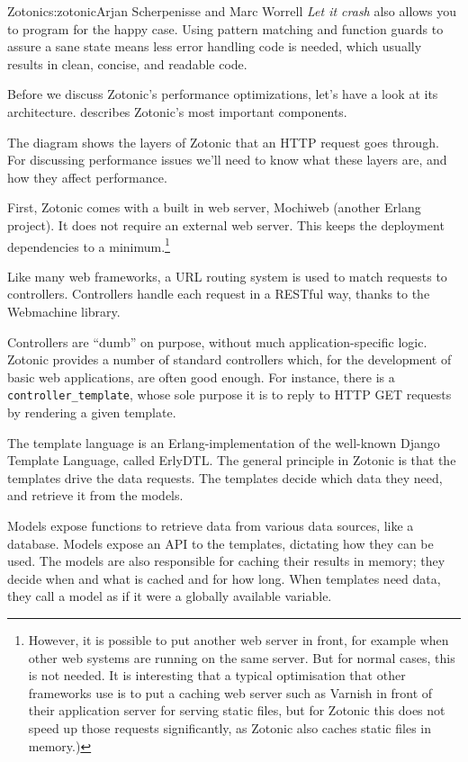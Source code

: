 \begin{aosachapter}{Zotonic}{s:zotonic}{Arjan Scherpenisse and Marc Worrell}
\emph{Let it crash} also allows you to program for the happy case. Using
pattern matching and function guards to assure a sane state means less
error handling code is needed, which usually results in clean, concise,
and readable code.


Before we discuss Zotonic's performance optimizations, let's have a look
at its architecture.  describes Zotonic's
most important components.


The diagram shows the layers of Zotonic that an HTTP request goes
through. For discussing performance issues we'll need to know what these
layers are, and how they affect performance.

First, Zotonic comes with a built in web server, Mochiweb (another
Erlang project). It does not require an external web server. This keeps
the deployment dependencies to a minimum.\footnote{However, it is
  possible to put another web server in front, for example when other
  web systems are running on the same server. But for normal cases, this
  is not needed. It is interesting that a typical optimisation that
  other frameworks use is to put a caching web server such as Varnish in
  front of their application server for serving static files, but for
  Zotonic this does not speed up those requests significantly, as
  Zotonic also caches static files in memory.)}

Like many web frameworks, a URL routing system is used to match requests
to controllers. Controllers handle each request in a RESTful way, thanks
to the Webmachine library.

Controllers are ``dumb'' on purpose, without much application-specific
logic. Zotonic provides a number of standard controllers which, for the
development of basic web applications, are often good enough. For
instance, there is a \texttt{controller\_template}, whose sole purpose
it is to reply to HTTP GET requests by rendering a given template.

The template language is an Erlang-implementation of the well-known
Django Template Language, called ErlyDTL. The general principle in
Zotonic is that the templates drive the data requests. The templates
decide which data they need, and retrieve it from the models.

Models expose functions to retrieve data from various data sources, like
a database. Models expose an API to the templates, dictating how they
can be used. The models are also responsible for caching their results
in memory; they decide when and what is cached and for how long. When
templates need data, they call a model as if it were a globally
available variable.


\end{aosachapter}

